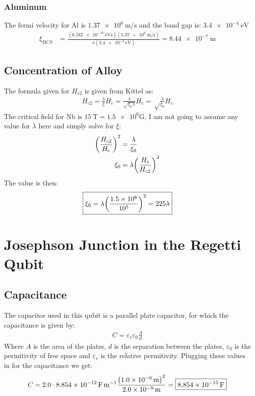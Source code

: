 \documentclass[12pt]{article}
\begin{document}
\subsubsection{Aluminum}
The fermi velocity for Al is $\SI{1.37e6}{\m\per\s}$ and the band gap is: $\SI{3.4e-4}{\eV}$
\begin{align*}
  \xi_{BCS}&=\frac{(\SI{6.582e-16}{\eV\s})(\SI{1.37e6}{\m\per\s})}
  {\pi(\SI{3.4e-4}{\eV})}=\boxed{\SI{8.44e-7}{\m}}
\end{align*}

\subsection{Concentration of Alloy}
The formula given for $H_{c2}$ is given from Kittel as:
\begin{align*}
  H_{c2}=\frac{\lambda}{\xi}H_c=\frac{\lambda}{\sqrt{\xi_0\lambda}}H_c
  =\sqrt\frac{\lambda}{\xi_0}H_c
\end{align*}
The critical field for Nb is $\SI{15}{\tesla}=\num{1.5e6}\text{G}$, I am not going to assume any value for $\lambda$ here and simply solve for $\xi$:
\begin{align*}
  \qty(\frac{H_{c2}}{H_c})^2&=\frac{\lambda}{\xi_0}\\
  \xi_0&=\lambda\qty(\frac{H_c}{H_{c2}})^2
\end{align*}
The value is then:
\begin{align*}
  \boxed{\xi_0=\lambda\qty(\frac{\num{1.5e6}}{10^5})^2=225\lambda}
\end{align*}
\section{Josephson Junction in the Regetti Qubit}
\subsection{Capacitance}
The capacitor used in this qubit is a parallel plate capacitor, for which the capacitance is given by:
\begin{align*}
  C=\varepsilon_r\varepsilon_0\frac{A}{d}
\end{align*}
Where $A$ is the area of the plates, $d$ is the separation between the plates, $\varepsilon_0$ is the permitivity of free space and $\varepsilon_r$ is the relative permitivity. Plugging these values in for the capacitance we get:
\begin{align*}
  C=2.0\cdot\SI{8.854e-12}{\farad\per\meter}
  \frac{\qty(\SI{1.0e-6}{\m})^2}{\SI{2.0e-9}{\m}}
  =\boxed{\SI{8.854e-15}{\F}}
\end{align*}
\end{document}
